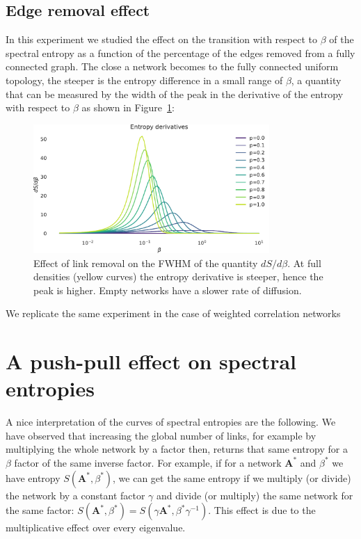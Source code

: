 \documentclass[a4paper]{article}
\newcommand{\bA}{\mathbf{A}}
\begin{document}
\subsection{Edge removal effect}
In this experiment we studied the effect on the transition with respect to $\beta$ of the spectral entropy as a function of the percentage of the edges removed from a fully connected graph.
The close a network becomes to the fully connected uniform topology, the steeper is the entropy difference in a small range of $\beta$, a quantity that can be measured by the width of the peak in the derivative of the entropy with respect to $\beta$ as shown in Figure~\ref{fig:beta_deriv_clique_removal}:
\begin{figure}[htb]
\centering
\includegraphics[width=0.8\textwidth]{entropy_derivative_er.pdf}
\caption{Effect of link removal on the FWHM of the quantity $dS/d\beta$. At full densities (yellow curves) the entropy derivative is steeper, hence the peak is higher. Empty networks have a slower rate of diffusion. }
\label{fig:beta_deriv_clique_removal}
\end{figure}

We replicate the same experiment in the case of weighted correlation networks

\newpage
\section{A push-pull effect on spectral entropies}
A nice interpretation of the curves of spectral entropies are the following.
We have observed that increasing the global number of links, for example by multiplying the whole network by a factor then, returns that same entropy for a $\beta$ factor of the same inverse factor.
For example, if for a network $\bA^*$ and $\beta^*$ we have entropy $S(\bA^*, \beta^*)$, we can get the same entropy if we multiply (or divide) the network by a constant factor $\gamma$ and divide (or multiply) the same network for the same factor: $S(\bA^*, \beta^*) = S(\gamma \bA^*, \beta^* \gamma^{-1})$. This effect is due to the multiplicative effect over every eigenvalue.
\end{document}
